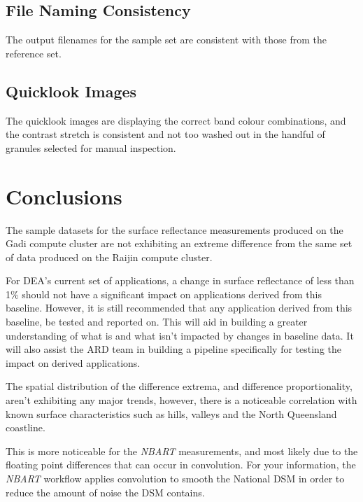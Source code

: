 \documentclass[a4paper]{article}
\begin{document}
    \subsection{File Naming Consistency}

      \begin{flushleft}
        The output filenames for the sample set are consistent with those from the reference set.
      \end{flushleft}

    \subsection{Quicklook Images}

      \begin{flushleft}
        The quicklook images are displaying the correct band colour combinations, and the contrast stretch is consistent and not too washed out in the handful of granules selected for manual inspection.
      \end{flushleft}

  \clearpage

  \section{Conclusions}

    \begin{flushleft}
      The sample datasets for the surface reflectance measurements produced on the Gadi compute cluster are not exhibiting an extreme difference from the same set of data produced on the Raijin compute cluster. \par
      For DEA's current set of applications, a change in surface reflectance of less than 1\% should not have a significant impact on applications derived from this baseline. However, it is still recommended that any application derived from this baseline, be tested and reported on. This will aid in building a greater understanding of what is and what isn't impacted by changes in baseline data. It will also assist the ARD team in building a pipeline specifically for testing the impact on derived applications. \par
      The spatial distribution of the difference extrema, and difference proportionality, aren't exhibiting any major trends, however, there is a noticeable correlation with known surface characteristics such as hills, valleys and the North Queensland coastline. \par
      This is more noticeable for the \textit{NBART} measurements, and most likely due to the floating point differences that can occur in convolution. For your information, the \textit{NBART} workflow applies convolution to smooth the National DSM in order to reduce the amount of noise the DSM contains. \par
    \end{flushleft}
\end{document}
